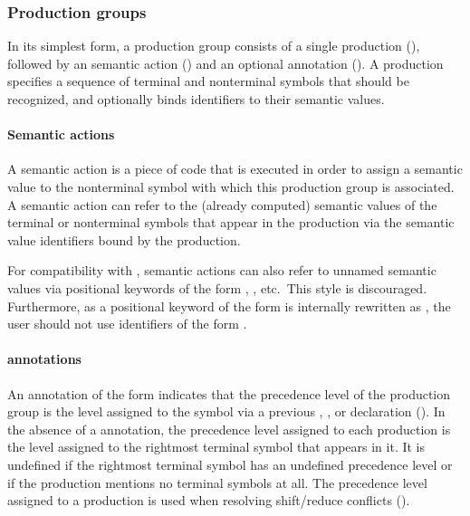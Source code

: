 \documentclass[onecolumn,11pt,nocopyrightspace,preprint]{sigplanconf}
\begin{document}
\subsubsection{Production groups}
\label{sec:productiongroups}

In its simplest form, a production group consists of a single production (),
followed by an \ocaml semantic action () and an optional
\dprec annotation (). A production specifies a sequence of terminal and
nonterminal symbols that should be recognized, and optionally binds
identifiers to their semantic values.

\paragraph{Semantic actions}
\label{sec:actions}

A semantic action is a piece of \ocaml code that is executed in order to
assign a semantic value to the nonterminal symbol with which this production
group is associated. A semantic action can refer to the (already computed)
semantic values of the terminal or nonterminal symbols that appear in the
production via the semantic value identifiers bound by the production.

For compatibility with \ocamlyacc, semantic actions can also refer to
unnamed semantic values via positional keywords of the form
, , etc.\ This style is discouraged. Furthermore, as
a positional keyword of the form  is internally rewritten as
, the user should not use identifiers of the form .

\paragraph{\dprec annotations}
\label{sec:prec}

An annotation of the form \dprec {} indicates that the precedence level
of the production group is the level assigned to the symbol  via a
previous \dnonassoc, \dleft, or \dright declaration (). In the
absence of a
\dprec annotation, the precedence level assigned to each production is the
level assigned to the rightmost terminal symbol that appears in it. It is
undefined if the rightmost terminal symbol has an undefined precedence level
or if the production mentions no terminal symbols at all. The precedence level
assigned to a production is used when resolving shift/reduce conflicts
().
\end{document}
